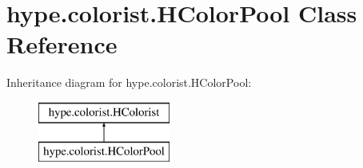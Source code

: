 \hypertarget{classhype_1_1colorist_1_1_h_color_pool}{\section{hype.\-colorist.\-H\-Color\-Pool Class Reference}
\label{classhype_1_1colorist_1_1_h_color_pool}
}
Inheritance diagram for hype.\-colorist.\-H\-Color\-Pool\-:\begin{figure}[H]
\begin{center}
\leavevmode
\includegraphics[height=2.000000cm]{classhype_1_1colorist_1_1_h_color_pool}
\end{center}
\end{figure}
